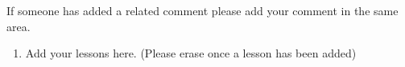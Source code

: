 If someone has added a related comment please add your comment in the same area.
\begin{enumerate}
\item Add your lessons here. (Please erase once a lesson has been added)
\end{enumerate}
